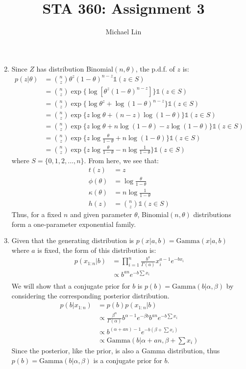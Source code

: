 \documentclass{article}
\title{STA 360: Assignment 3}
\author{Michael Lin}
\begin{document}
\maketitle

\begin{enumerate}
\setcounter{enumi}{1}

\item Since $Z$ has distribution Binomial$(n,\theta)$, the p.d.f. of $z$ is:
\begin{align*}
p(z|\theta) &= {n \choose z} \theta^z(1-\theta)^{n-z} \mathds{1}(z\in S)\\
&={n \choose z} \exp \{ \log[\theta^z(1-\theta)^{n-z}] \} \mathds{1}(z\in S)\\ 
&={n \choose z} \exp \{\log\theta^z+\log(1-\theta)^{n-z} \} \mathds{1}(z\in S)\\
&={n \choose z} \exp \{z\log\theta+(n-z)\log(1-\theta) \} \mathds{1}(z\in S)\\
&={n \choose z} \exp \{z\log\theta+n\log(1-\theta)-z\log(1-\theta) \} \mathds{1}(z\in S)\\
&={n \choose z} \exp \{z\log\frac{\theta}{1-\theta}+n\log(1-\theta) \} \mathds{1}(z\in S)\\
&={n \choose z} \exp \{z\log\frac{\theta}{1-\theta}-n\log\frac{1}{1-\theta} \}\mathds{1}(z\in S)
\end{align*}
where $S = \{0,1,2,...,n\}$. From here, we see that:
\begin{align*}
t(z)&=z \\
\phi(\theta)&=\log\frac{\theta}{1-\theta} \\
\kappa(\theta) &= n\log\frac{1}{1-\theta} \\
h(z)&={n \choose z} \mathds{1}(z\in S)
\end{align*}
Thus, for a fixed $n$ and given parameter $\theta$, Binomial$(n,\theta)$ distributions form a one-parameter exponential family.

\item Given that the generating distribution is $p(x|a,b)=\text{Gamma}(x|a,b)$ where $a$ is fixed, the form of this distribution is:
\begin{align*}
p(x_{1:n}|b) &= \prod\limits_{i=1}^{n} \frac{b^a}{\Gamma(a)} x_i^{a-1}e^{-bx_i} \\
&\propto b^{an}e^{-b\sum x_i} \\
\end{align*}
We will show that a conjugate prior for $b$ is $p(b) = \text{Gamma}(b|\alpha,\beta)$ by considering the corresponding posterior distribution.
\begin{align*}
p(b|x_{1:n})&=p(b)p(x_{1:n}|b) \\
&\propto \frac{\beta^\alpha}{\Gamma(\alpha)}b^{\alpha-1}e^{-\beta b}b^{an}e^{-b\sum x_i} \\
&\propto b^{(\alpha+an)-1}e^{-b(\beta+\sum x_i)} \\
&\propto \text{Gamma}(b|\alpha+an,\beta+\sum x_i)
\end{align*}
Since the posterior, like the prior, is also a Gamma distribution, thus $p(b) = \text{Gamma}(b|\alpha,\beta)$ is a conjugate prior for $b$.


\end{enumerate}
\end{document}
